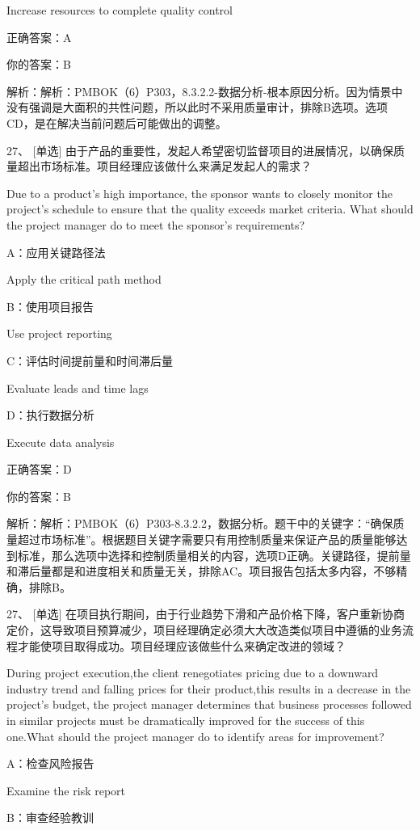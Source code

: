 Increase resources to complete quality control

正确答案：A

你的答案：B

解析：解析：PMBOK（6）P303，8.3.2.2-数据分析-根本原因分析。因为情景中没有强调是大面积的共性问题，所以此时不采用质量审计，排除B选项。选项CD，是在解决当前问题后可能做出的调整。


27、 [单选] 由于产品的重要性，发起人希望密切监督项目的进展情况，以确保质量超出市场标准。项目经理应该做什么来满足发起人的需求？

Due to a product’s high importance, the sponsor wants to closely monitor the project's schedule to ensure that the quality exceeds market criteria. What should the project manager do to meet the sponsor’s requirements?

A：应用关键路径法

Apply the critical path method

B：使用项目报告

Use project reporting

C：评估时间提前量和时间滞后量

Evaluate leads and time lags

D：执行数据分析

Execute data analysis

正确答案：D

你的答案：B

解析：解析：PMBOK（6）P303-8.3.2.2，数据分析。题干中的关键字：“确保质量超过市场标准”。根据题目关键字需要只有用控制质量来保证产品的质量能够达到标准，那么选项中选择和控制质量相关的内容，选项D正确。关键路径，提前量和滞后量都是和进度相关和质量无关，排除AC。项目报告包括太多内容，不够精确，排除B。


27、 [单选] 在项目执行期间，由于行业趋势下滑和产品价格下降，客户重新协商定价，这导致项目预算减少，项目经理确定必须大大改造类似项目中遵循的业务流程才能使项目取得成功。项目经理应该做些什么来确定改进的领域？

During project execution,the client renegotiates pricing due to a downward industry trend and falling prices for their product,this results in a decrease in the project's budget, the project manager determines that business processes followed in similar projects must be dramatically improved for the success of this one.What should the project manager do to identify areas for improvement?

A：检查风险报告

Examine the risk report

B：审查经验教训

